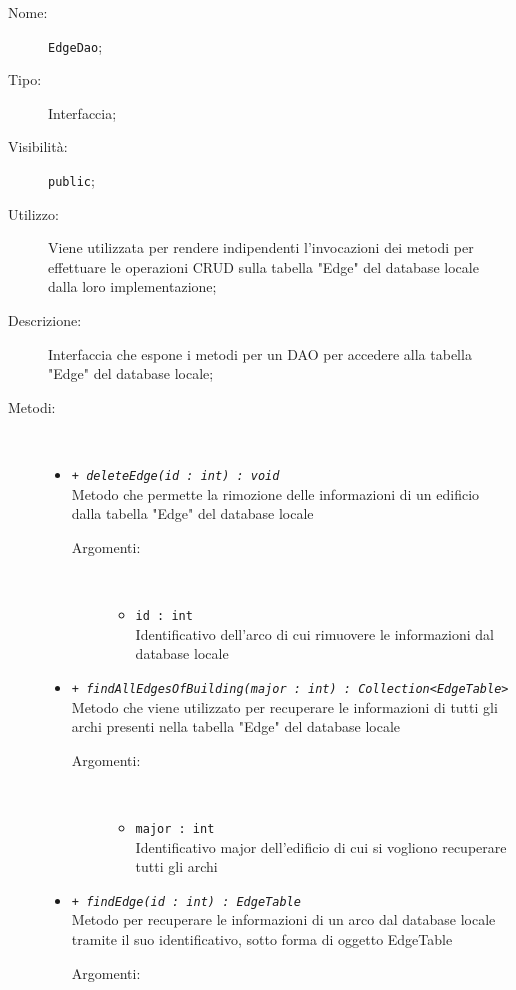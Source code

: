 \documentclass[../DefinizioneDiProdotto.tex]{subfiles}
\begin{document}
    \begin{description}
\item[Nome:] \texttt{EdgeDao};
\item[Tipo:] Interfaccia;
\item[Visibilità:] \texttt{public};
\item[Utilizzo:] Viene utilizzata per rendere indipendenti l'invocazioni dei metodi per effettuare le operazioni CRUD sulla tabella "Edge" del database locale dalla loro implementazione;
\item[Descrizione:] Interfaccia che espone i metodi per un DAO per accedere alla tabella "Edge" del database locale;
\item[Metodi:] \
\begin{itemize}
\item \texttt{+ \textit{deleteEdge(id : int) : void}}\\
Metodo che permette la rimozione delle informazioni di un edificio dalla tabella "Edge" del database locale 
 \begin{description}
\item[Argomenti:] \
\begin{itemize}
\item \texttt{id : int}\\
Identificativo dell'arco di cui rimuovere le informazioni dal database locale\end{itemize}
\end{description}
\item \texttt{+ \textit{findAllEdgesOfBuilding(major : int) : Collection<EdgeTable>}}\\
Metodo che viene utilizzato per recuperare le informazioni di tutti gli archi presenti nella tabella "Edge" del database locale
 \begin{description}
\item[Argomenti:] \
\begin{itemize}
\item \texttt{major : int}\\
Identificativo major dell'edificio di cui si vogliono recuperare tutti gli archi\end{itemize}
\end{description}
\item \texttt{+ \textit{findEdge(id : int) : EdgeTable}}\\
Metodo per recuperare le informazioni di un arco dal database locale tramite il suo identificativo, sotto forma di oggetto EdgeTable
 \begin{description}
\item[Argomenti:] \

\end{description}
\end{itemize}
\end{description}
\end{document}
